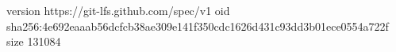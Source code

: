 version https://git-lfs.github.com/spec/v1
oid sha256:4e692eaaab56dcfcb38ae309e141f350cdc1626d431c93dd3b01ece0554a722f
size 131084
